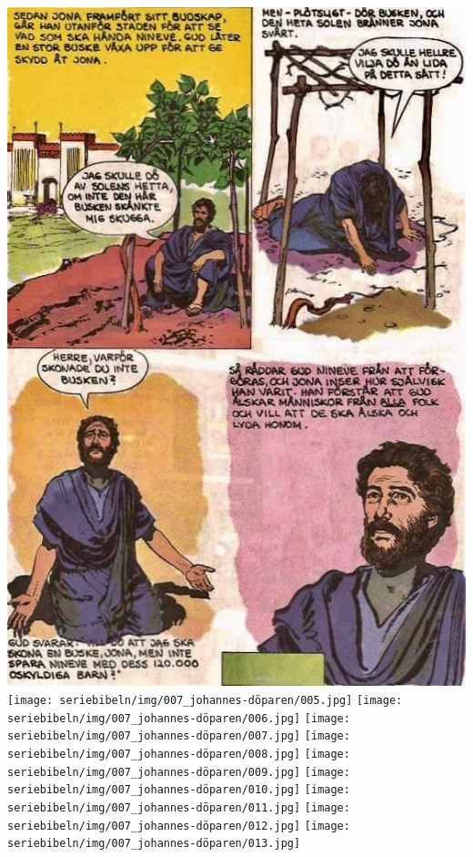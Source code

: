 \includegraphics[width=\textwidth]{seriebibeln/img/006_jona-serie/012.jpg}
\texttt{[image: seriebibeln/img/007\_johannes-döparen/005.jpg]}
\texttt{[image: seriebibeln/img/007\_johannes-döparen/006.jpg]}
\texttt{[image: seriebibeln/img/007\_johannes-döparen/007.jpg]}
\texttt{[image: seriebibeln/img/007\_johannes-döparen/008.jpg]}
\texttt{[image: seriebibeln/img/007\_johannes-döparen/009.jpg]}
\texttt{[image: seriebibeln/img/007\_johannes-döparen/010.jpg]}
\texttt{[image: seriebibeln/img/007\_johannes-döparen/011.jpg]}
\texttt{[image: seriebibeln/img/007\_johannes-döparen/012.jpg]}
\texttt{[image: seriebibeln/img/007\_johannes-döparen/013.jpg]}
